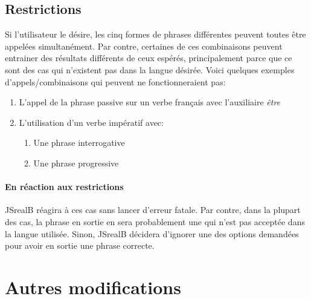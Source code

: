 \documentclass[11pt]{article} %
\newcommand{\system}[1]{\textsf{#1}}
\newcommand{\JSB}{\system{JSrealB}}
\begin{document}
\subsection{Restrictions}
\label{restricType}
Si l'utilisateur le désire, les cinq formes de phrases différentes peuvent toutes être appelées simultanément. Par contre, certaines de ces combinaisons peuvent entrainer des résultats différents de ceux espérés, principalement parce que ce sont des cas qui n'existent pas dans la langue désirée. Voici quelques exemples d'appels/combinaisons qui peuvent ne fonctionneraient pas:
\begin{enumerate}
\item L'appel de la phrase passive sur un verbe français avec l'auxiliaire \emph{être}
\item L'utilisation d'un verbe impératif avec:
\begin{enumerate}
\item Une phrase interrogative
\item Une phrase progressive
\end{enumerate}
\end{enumerate}

\paragraph{En réaction aux restrictions}
\JSB{} réagira à ces cas sans lancer d'erreur fatale. Par contre, dans la plupart des cas, la phrase en sortie en sera probablement une qui n'est pas acceptée dans la langue utilisée. Sinon, \JSB{} décidera d'ignorer une des options demandées pour avoir en sortie une phrase correcte.


\section{Autres modifications}
\end{document}
